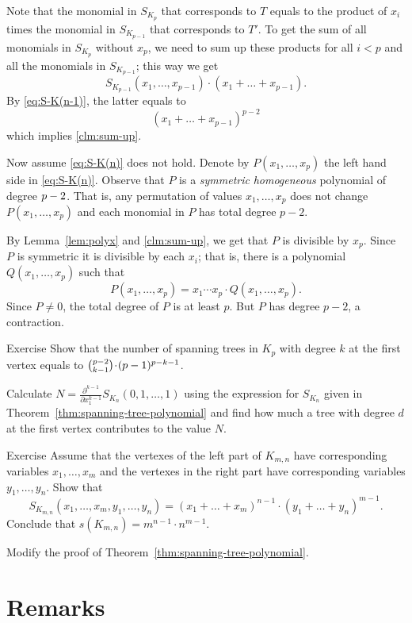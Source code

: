 Note that the monomial in $S_{K_p}$ that corresponds to $T$ equals 
to the product of $x_i$ times the monomial in $S_{K_{p-1}}$
that corresponds to $T'$.
To get the sum of all monomials in $S_{K_p}$ without $x_p$, we need to sum up these products for all $i<p$ and all the monomials in $S_{K_{p-1}}$; this way we get 
\[S_{K_{p-1}}(x_1,\dots,x_{p-1})\cdot(x_1+\dots+x_{p-1}).\]
By \ref{eq:S-K(n-1)}, the latter equals to
\[(x_1+\dots+x_{p-1})^{p-2}\]
which implies \ref{clm:sum-up}.

Now assume \ref{eq:S-K(n)} does not hold.
Denote by $P(x_1,\dots,x_p)$ the left hand side in \ref{eq:S-K(n)}.
Observe that $P$ is a {}\emph{symmetric} {}\emph{homogeneous} polynomial of degree $p\z-2$.
That is, any permutation of values $x_1,\dots, x_p$ does not change $P(x_1,\dots,x_p)$ and each monomial in $P$ has total degree $p-2$.

By Lemma~\ref{lem:polyx} and \ref{clm:sum-up}, we get that $P$ is divisible by $x_p$.
Since $P$ is symmetric it is divisible by each $x_i$;
that is, there is a polynomial $Q(x_1,\dots,x_p)$ such that 
\[P(x_1,\dots,x_p)=x_1\cdots x_p\cdot Q(x_1,\dots,x_p).\]
Since $P\ne 0$, the total degree of $P$ is at least $p$.
But $P$ has degree $p-2$, a contraction.
\qeds

\begin{thm}{Exercise}
Show that the number of spanning trees in $K_p$ with degree $k$ at the first vertex equals to $\tbinom{p-2}{k-1}\cdot (p-1)^{p-k-1}$.
\end{thm}

 Calculate $N=\tfrac{\partial^{k-1} }{\partial x_1^{k-1}}S_{K_n}(0,1,\dots,1)$ using the expression for $S_{K_n}$ given in Theorem~\ref{thm:spanning-tree-polynomial} and find how much a tree with degree $d$ at the first vertex contributes to the value $N$.


\begin{thm}{Exercise}
Assume that the vertexes of the left part of $K_{m,n}$ have corresponding variables $x_1,\dots,x_m$ and the vertexes in the right part have corresponding variables $y_1,\dots,y_n$. 
Show that
\[S_{K_{m,n}}(x_1,\dots,x_m,y_1,\dots,y_n)=(x_1+\dots +x_m)^{n-1}\cdot(y_1+\dots +y_n)^{m-1}.\]
Conclude that $s(K_{m,n})=m^{n-1}\cdot n^{m-1}$.

\end{thm}

 Modify the proof of Theorem~\ref{thm:spanning-tree-polynomial}.

\section*{Remarks}

